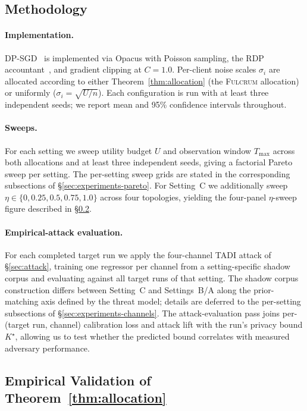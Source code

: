 \documentclass[letterpaper,journal]{IEEEtran}
\newcommand{\TADI}{\textsc{TADI}\xspace}
\newcommand{\Fulcrum}{\textsc{Fulcrum}\xspace}
\newcommand{\Tmax}{T_{\max}}
\begin{document}
\subsection{Methodology}
\label{sec:experiments-methodology}

\paragraph{Implementation.}
DP-SGD~\cite{abadi2016dpsgd} is implemented via Opacus with
Poisson sampling, the RDP accountant~\cite{mironov2017rdp}, and
gradient clipping at $C=1.0$. Per-client noise scales $\sigma_i$ are
allocated according to either Theorem~\ref{thm:allocation} (the
\Fulcrum allocation) or uniformly ($\sigma_i=\sqrt{U/n}$). Each
configuration is run with at least three independent seeds; we report
mean and 95\% confidence intervals throughout.

\paragraph{Sweeps.}
For each setting we sweep utility budget $U$ and observation window
$\Tmax$ across both allocations and at least three independent seeds,
giving a factorial Pareto sweep per setting. The per-setting sweep
grids are stated in the corresponding subsections of
\S\ref{sec:experiments-pareto}. For Setting~C we additionally sweep
$\eta \in \{0, 0.25, 0.5, 0.75, 1.0\}$ across four topologies, yielding
the four-panel $\eta$-sweep figure described in
\S\ref{sec:experiments-eta}.

\paragraph{Empirical-attack evaluation.}
For each completed target run we apply the four-channel \TADI attack
of \S\ref{sec:attack}, training one regressor per channel from a
setting-specific shadow corpus and evaluating against all target runs
of that setting. The shadow corpus construction differs between
Setting~C and Settings~B/A along the prior-matching axis defined by
the threat model; details are deferred to the per-setting subsections
of \S\ref{sec:experiments-channels}. The attack-evaluation pass joins
per-(target run, channel) calibration loss and attack lift with the
run's privacy bound $K^\star$, allowing us to test whether the
predicted bound correlates with measured adversary performance.

\subsection{Empirical Validation of Theorem~\ref{thm:allocation}}
\label{sec:experiments-eta}
\end{document}
